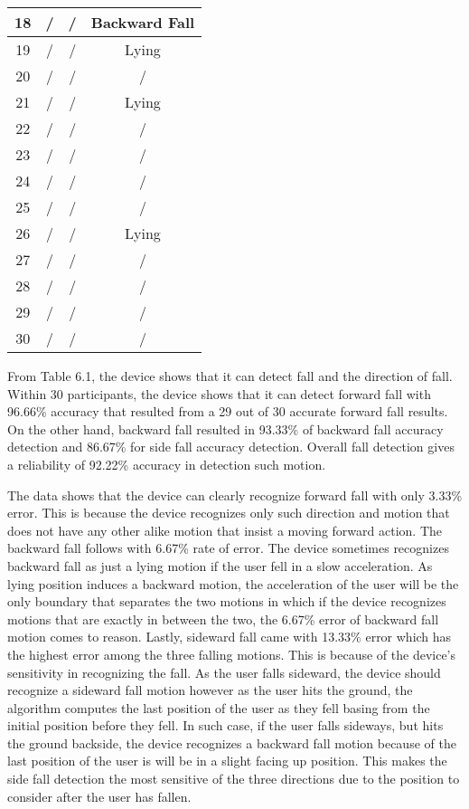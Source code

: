 \begin{table}[htbp]
{\begin{tabular}{|c|c|c|c|}
    \midrule
    18    & /     & /     & Backward Fall \\
    \midrule
    19    & /     & /     & Lying \\
    \midrule
    20    & /     & /     & / \\
    \midrule
    21    & /     & /     & Lying \\
    \midrule
    22    & /     & /     & / \\
    \midrule
    23    & /     & /     & / \\
    \midrule
    24    & /     & /     & / \\
    \midrule
    25    & /     & /     & / \\
    \midrule
    26    & /     & /     & Lying \\
    \midrule
    27    & /     & /     & / \\
    \midrule
    28    & /     & /     & / \\
    \midrule
    29    & /     & /     & / \\
    \midrule
    30    & /     & /     & / \\
    \bottomrule
    \end{tabular}%
		}
  \label{tab:Falling Motions Data}%
\end{table}%

From Table 6.1, the device shows that it can detect fall and the direction of fall. Within 30 participants, the device shows that it can detect forward fall with 96.66\% accuracy that resulted from a 29 out of 30 accurate forward fall results. On the other hand, backward fall resulted in 93.33\% of backward fall accuracy detection and 86.67\% for side fall accuracy detection. Overall fall detection gives a reliability of 92.22\% accuracy in detection such motion.

The data shows that the device can clearly recognize forward fall with only 3.33\% error. This is because the device recognizes only such direction and motion that does not have any other alike motion that insist a moving forward action. The backward fall follows with 6.67\% rate of error. The device sometimes recognizes backward fall as just a lying motion if the user fell in a slow acceleration. As lying position induces a backward motion, the acceleration of the user will be the only boundary that separates the two motions in which if the device recognizes motions that are exactly in between the two, the 6.67\% error of backward fall motion comes to reason. Lastly, sideward fall came with 13.33\% error which has the highest error among the three falling motions. This is because of the device’s sensitivity in recognizing the fall. As the user falls  sideward, the device should recognize a sideward fall motion however as the user hits the ground, the algorithm computes the last position of the user as they fell basing from the initial position before they fell. In such case, if the user falls sideways, but hits the ground backside, the device recognizes a backward fall motion because of the last position of the user is will be in a slight facing up position. This makes the side fall detection the most sensitive of the three directions due to the position to consider after the user has fallen.

